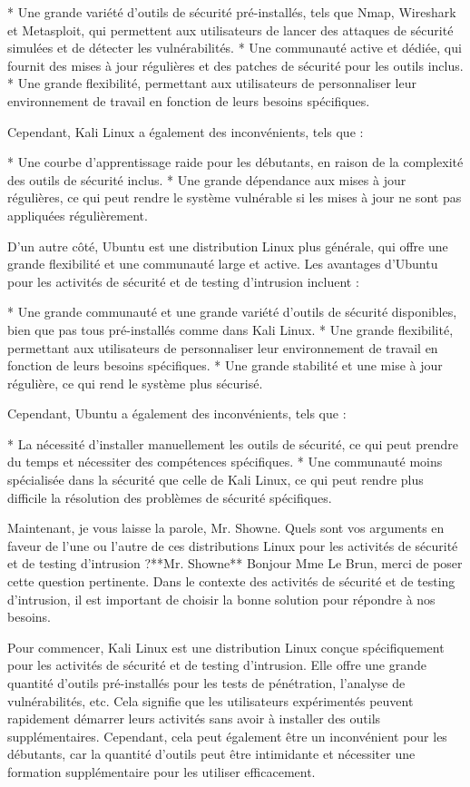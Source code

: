 * Une grande variété d'outils de sécurité pré-installés, tels que Nmap, Wireshark et Metasploit, qui permettent aux utilisateurs de lancer des attaques de sécurité simulées et de détecter les vulnérabilités.
* Une communauté active et dédiée, qui fournit des mises à jour régulières et des patches de sécurité pour les outils inclus.
* Une grande flexibilité, permettant aux utilisateurs de personnaliser leur environnement de travail en fonction de leurs besoins spécifiques.

Cependant, Kali Linux a également des inconvénients, tels que :

* Une courbe d'apprentissage raide pour les débutants, en raison de la complexité des outils de sécurité inclus.
* Une grande dépendance aux mises à jour régulières, ce qui peut rendre le système vulnérable si les mises à jour ne sont pas appliquées régulièrement.

D'un autre côté, Ubuntu est une distribution Linux plus générale, qui offre une grande flexibilité et une communauté large et active. Les avantages d'Ubuntu pour les activités de sécurité et de testing d'intrusion incluent :

* Une grande communauté et une grande variété d'outils de sécurité disponibles, bien que pas tous pré-installés comme dans Kali Linux.
* Une grande flexibilité, permettant aux utilisateurs de personnaliser leur environnement de travail en fonction de leurs besoins spécifiques.
* Une grande stabilité et une mise à jour régulière, ce qui rend le système plus sécurisé.

Cependant, Ubuntu a également des inconvénients, tels que :

* La nécessité d'installer manuellement les outils de sécurité, ce qui peut prendre du temps et nécessiter des compétences spécifiques.
* Une communauté moins spécialisée dans la sécurité que celle de Kali Linux, ce qui peut rendre plus difficile la résolution des problèmes de sécurité spécifiques.

Maintenant, je vous laisse la parole, Mr. Showne. Quels sont vos arguments en faveur de l'une ou l'autre de ces distributions Linux pour les activités de sécurité et de testing d'intrusion ?**Mr. Showne**
Bonjour Mme Le Brun, merci de poser cette question pertinente. Dans le contexte des activités de sécurité et de testing d'intrusion, il est important de choisir la bonne solution pour répondre à nos besoins. 

Pour commencer, Kali Linux est une distribution Linux conçue spécifiquement pour les activités de sécurité et de testing d'intrusion. Elle offre une grande quantité d'outils pré-installés pour les tests de pénétration, l'analyse de vulnérabilités, etc. Cela signifie que les utilisateurs expérimentés peuvent rapidement démarrer leurs activités sans avoir à installer des outils supplémentaires. Cependant, cela peut également être un inconvénient pour les débutants, car la quantité d'outils peut être intimidante et nécessiter une formation supplémentaire pour les utiliser efficacement.

